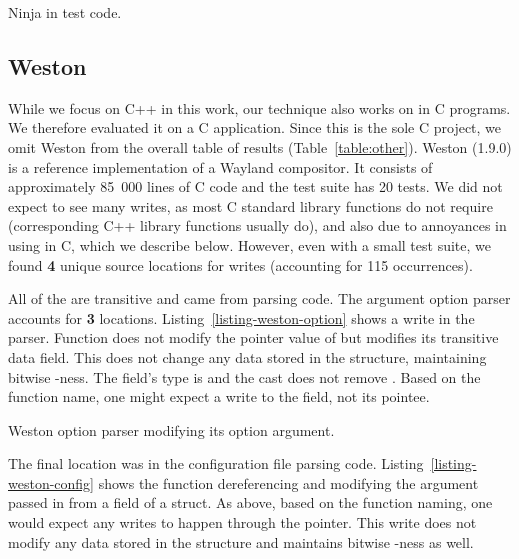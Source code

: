 \begin{listing}[!htb]
  \caption{Ninja \wtc{} in test code.}
  \label{listing-ninja}
  \centering
  
\end{listing}

\subsection{Weston}

While we focus on C++ in this work, our technique also works on \const{} in C
programs.
We therefore evaluated it on a C application.
Since this is the sole C project, we omit Weston from the overall table
of results (Table~\ref{table:other}).
Weston (1.9.0) is a reference implementation of a Wayland compositor.
It consists of approximately 85~000 lines of C code and the test suite has 20
tests.
We did not expect to see many writes, as most C standard library functions do
not require \const{} (corresponding C++ library functions usually do), and
also due to annoyances in using \const{} in C, which we describe below.
However, even with a small test suite, we found {\bf 4} unique source locations
for writes (accounting for 115 occurrences).

All of the \wstc{} are transitive and came from parsing code.
The argument option parser accounts for {\bf 3} locations.
Listing~\ref{listing-weston-option} shows a write in the parser.
Function  does not modify the pointer value of
 but modifies its transitive data field.
This does not change any data stored in the  structure,
maintaining bitwise \const{}-ness.
The  field's type is  and the cast does not remove
\const{}.
Based on the function name, one might expect a write to the  field,
not its pointee.

\begin{listing}[!htb]
  \caption{Weston option parser modifying its \const{} option argument.}
  \label{listing-weston-option}
  \centering
  
\end{listing}

The final location was in the configuration file parsing code.
Listing~\ref{listing-weston-config} shows the
 function dereferencing and modifying
the  argument passed in from a field of a \const{} struct.
As above, based on the function naming, one would expect any writes to happen
through the  pointer.
This write does not modify any data stored in the 
structure and maintains bitwise \const{}-ness as well.

